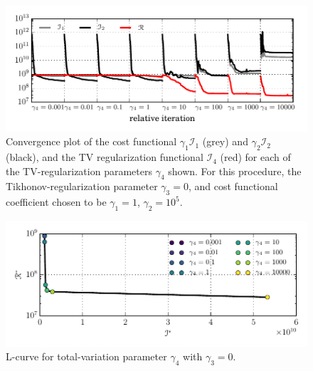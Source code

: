 \begin{figure}
  \centering
    \includegraphics[width=\linewidth]{images/data_assimilation/l_curve/TV_convergence.pdf}
    \caption[Total-variation regularized ISMIP-HOM convergence diagram]{Convergence plot of the cost functional $\gamma_1 \mathscr{I}_1$ (grey) and $\gamma_2 \mathscr{I}_2$ (black), and the TV regularization functional $\mathscr{I}_4$ (red) for each of the TV-regularization parameters $\gamma_4$ shown.  For this procedure, the Tikhonov-regularization parameter $\gamma_3 = 0$, and cost functional coefficient chosen to be $\gamma_1 =1$, $\gamma_2 = 10^5$.}
  \label{ismip_l_curve_convergence_tv}
\end{figure}

\begin{figure}
  \centering
    \includegraphics[width=\linewidth]{images/data_assimilation/l_curve/TV_l_curve.pdf}
    \caption[ISMIP-HOM total-variation L-curve diagram]{L-curve for total-variation parameter $\gamma_4$ with $\gamma_3=0$.}
  \label{ismip_l_curve_tv}
\end{figure}

